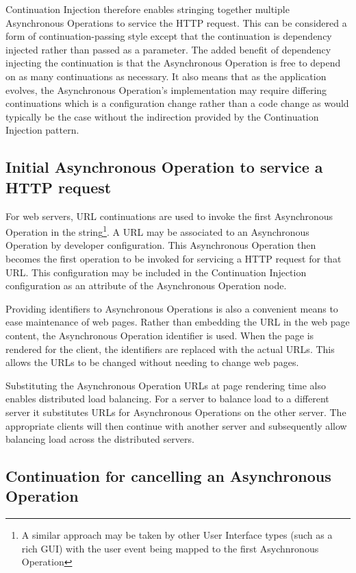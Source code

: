 \documentclass[prodmode]{style/acmlarge}
\begin{document}
Continuation Injection therefore enables stringing together multiple
Asynchronous Operations to service the HTTP request.  This can be considered a
form of continuation-passing style \cite{continuations} except that the
continuation is dependency injected rather than passed as a parameter.  The
added benefit of dependency injecting the continuation is that the Asynchronous
Operation is free to depend on as many continuations as necessary.  It also
means that as the application evolves, the Asynchronous Operation's
implementation may require differing continuations which is a configuration
change rather than a code change as would typically be the case without the
indirection provided by the Continuation Injection pattern.


\subsection{Initial Asynchronous Operation to service a HTTP request}

For web servers, URL continuations \cite{url-continuation} are used to invoke
the first Asynchronous Operation in the string\footnote{A similar approach may
be taken by other User Interface types (such as a rich GUI) with the user event
being mapped to the first Asychnronous Operation}.  A URL may be associated to
an Asynchronous Operation by developer configuration.  This Asynchronous
Operation then becomes the first operation to be invoked for servicing a HTTP
request for that URL.  This configuration may be included in the Continuation
Injection configuration as an attribute of the Asynchronous Operation node.

Providing identifiers to Asynchronous Operations is also a convenient means to
ease maintenance of web pages.  Rather than embedding the URL in the web page
content, the Asynchronous Operation identifier is used.  When the page is
rendered for the client, the identifiers are replaced with the actual URLs.
This allows the URLs to be changed without needing to change web pages.

Substituting the Asynchronous Operation URLs at page rendering time also enables
distributed load balancing.  For a server to balance load to a different server
it substitutes URLs for Asynchronous Operations on the other server. The
appropriate clients will then continue with another server and subsequently
allow balancing load across the distributed servers.


\subsection{Continuation for cancelling an Asynchronous Operation}
\end{document}
